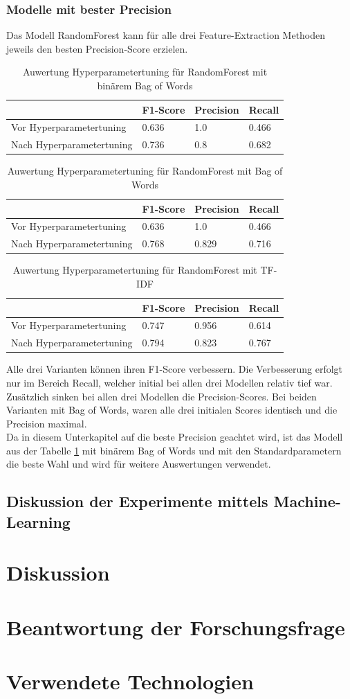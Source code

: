 \subsubsection{Modelle mit bester Precision}
Das Modell RandomForest kann für alle drei Feature-Extraction Methoden jeweils den besten Precision-Score erzielen.\\
\begin{table}[H]
	\caption{Auwertung Hyperparametertuning für RandomForest mit binärem Bag of Words}
	\centering
	\label{tab:bow-rf}
	\begin{tabular}{|l|l|l|l|}
		\hline
		& F1-Score & Precision & Recall\\
		\hline
		Vor Hyperparametertuning & 0.636 & 1.0 & 0.466 \\
		Nach Hyperparametertuning & 0.736 & 0.8 & 0.682 \\
		\hline
	\end{tabular}
\end{table}
\begin{table}[H]
	\caption{Auwertung Hyperparametertuning für RandomForest mit Bag of Words}
	\centering
	\begin{tabular}{|l|l|l|l|}
		\hline
		& F1-Score & Precision & Recall\\
		\hline
		Vor Hyperparametertuning & 0.636 & 1.0 & 0.466 \\
		Nach Hyperparametertuning & 0.768 & 0.829 & 0.716 \\
		\hline
	\end{tabular}
\end{table}
\begin{table}[H]
	\caption{Auwertung Hyperparametertuning für RandomForest mit TF-IDF}
	\centering
	\begin{tabular}{|l|l|l|l|}
		\hline
		& F1-Score & Precision & Recall\\
		\hline
		Vor Hyperparametertuning & 0.747 & 0.956 & 0.614 \\
		Nach Hyperparametertuning & 0.794 & 0.823 & 0.767 \\
		\hline
	\end{tabular}
\end{table}
Alle drei Varianten können ihren F1-Score verbessern.
Die Verbesserung erfolgt nur im Bereich Recall, welcher initial bei allen drei Modellen relativ tief war.
Zusätzlich sinken bei allen drei Modellen die Precision-Scores.
Bei beiden Varianten mit Bag of Words, waren alle drei initialen Scores identisch und die Precision maximal.\\
Da in diesem Unterkapitel auf die beste Precision geachtet wird, ist das Modell aus der Tabelle \cref{tab:bow-rf} mit binärem Bag of Words und mit den Standardparametern die beste Wahl und wird für weitere Auswertungen verwendet.
\subsection{Diskussion der Experimente mittels Machine-Learning}
\section{Diskussion}
\section{Beantwortung der Forschungsfrage}
\section{Verwendete Technologien}